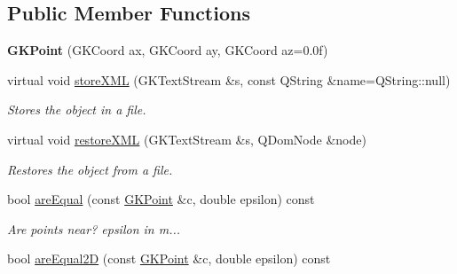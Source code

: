 \subsection*{Public Member Functions}
\begin{DoxyCompactItemize}
\item 
{\bfseries G\+K\+Point} (G\+K\+Coord ax, G\+K\+Coord ay, G\+K\+Coord az=0.\+0f)\hypertarget{classGKPoint_a512a7bcf6b31e17d42457850c83b964c}{}\label{classGKPoint_a512a7bcf6b31e17d42457850c83b964c}

\item 
virtual void \hyperlink{classGKPoint_a9322b1c4658817f31230c028fb7eda97}{store\+X\+ML} (G\+K\+Text\+Stream \&s, const Q\+String \&name=Q\+String\+::null)\hypertarget{classGKPoint_a9322b1c4658817f31230c028fb7eda97}{}\label{classGKPoint_a9322b1c4658817f31230c028fb7eda97}

\begin{DoxyCompactList}\small\item\em Stores the object in a file. \end{DoxyCompactList}\item 
virtual void \hyperlink{classGKPoint_a8e86395ad656e94a71c5c42c4e92e995}{restore\+X\+ML} (G\+K\+Text\+Stream \&s, Q\+Dom\+Node \&node)\hypertarget{classGKPoint_a8e86395ad656e94a71c5c42c4e92e995}{}\label{classGKPoint_a8e86395ad656e94a71c5c42c4e92e995}

\begin{DoxyCompactList}\small\item\em Restores the object from a file. \end{DoxyCompactList}\item 
bool \hyperlink{classGKPoint_ad2e891020b49e2a9549f6494cea7b8c8}{are\+Equal} (const \hyperlink{classGKPoint}{G\+K\+Point} \&c, double epsilon) const \hypertarget{classGKPoint_ad2e891020b49e2a9549f6494cea7b8c8}{}\label{classGKPoint_ad2e891020b49e2a9549f6494cea7b8c8}

\begin{DoxyCompactList}\small\item\em Are points near? epsilon in m... \end{DoxyCompactList}\item 
bool \hyperlink{classGKPoint_ad69cf74184795f829bc23a7842c9d52d}{are\+Equal2D} (const \hyperlink{classGKPoint}{G\+K\+Point} \&c, double epsilon) const \hypertarget{classGKPoint_ad69cf74184795f829bc23a7842c9d52d}{}\label{classGKPoint_ad69cf74184795f829bc23a7842c9d52d}


\end{DoxyCompactItemize}

